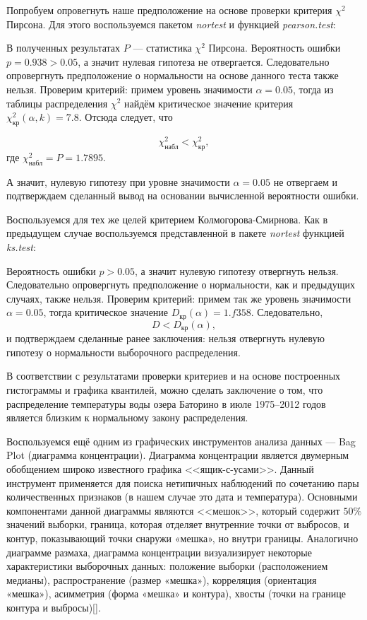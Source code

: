 Попробуем опровегнуть наше предположение на основе проверки критерия $\chi^2$ Пирсона. Для этого воспользуемся пакетом \textit{nortest} и функцией \textit{pearson.test}:

В полученных результатах $P$ --- статистика $\chi^2$ Пирсона. Вероятность ошибки $p = 0.938 > 0.05$, а значит нулевая гипотеза не отвергается. Следовательно опровергнуть предположение о нормальности на основе данного теста также нельзя. Проверим критерий: примем уровень значимости $\alpha = 0.05$, тогда из таблицы распределения $\chi^2$ найдём критическое значение критерия $\chi_{\textrm{кр}}^2(\alpha, k) = 7.8$. Отсюда следует, что

\begin{equation*}
	\chi_{\textrm{набл}}^2 < \chi_{\textrm{кр}}^2,
\end{equation*}
где $\chi_{\textrm{набл}}^2 = P = 1.7895$.

А значит, нулевую гипотезу при уровне значимости $\alpha = 0.05$ не отвергаем и подтверждаем сделанный вывод на основании вычисленной вероятности ошибки. 

Воспользуемся для тех же целей критерием Колмогорова-Смирнова. Как в предыдущем случае воспользуемся представленной в пакете \textit{nortest} функцией \textit{ks.test}:

Вероятность ошибки $p > 0.05$, а значит нулевую гипотезу отвергнуть нельзя. Следовательно опровергнуть предположение о нормальности, как и предыдущих случаях, также нельзя. Проверим критерий: примем так же уровень значимости $\alpha = 0.05$, тогда критическое значение $D_{\textrm{кр}}(\alpha) = 1.f358$. Следовательно,
\begin{equation*}
	D < D_{\textrm{кр}}(\alpha),
\end{equation*}
и подтверждаем сделанные ранее заключения: нельзя отвергнуть нулевую гипотезу о нормальности выборочного распределения.

В соответствии с результатами проверки критериев и на основе построенных гистограммы и графика квантилей, можно сделать заключение о том, что распределение температуры воды озера Баторино в июле 1975--2012 годов является близким к нормальному закону распределения.

Воспользуемся ещё одним из графических инструментов анализа данных --- Bag Plot (диаграмма концентрации). 
Диаграмма концентрации является двумерным обобщением широко известного графика <<ящик-с-усами>>. Данный инструмент применяется для поиска нетипичных наблюдений по сочетанию пары количественных признаков (в нашем случае это дата и температура). Основными компонентами данной диаграммы являются <<мешок>>, который 
содержит $50\%$ значений выборки, граница, которая отделяет внутренние точки от выбросов, и контур, показывающий точки снаружи «мешка», но внутри границы. Аналогично диаграмме размаха, диаграмма концентрации 
визуализирует некоторые характеристики выборочных данных: положение выборки (расположением медианы), распространение (размер «мешка»), корреляция (ориентация «мешка»), асимметрия (форма «мешка» и контура), 
хвосты (точки на границе контура и выбросы)[].

